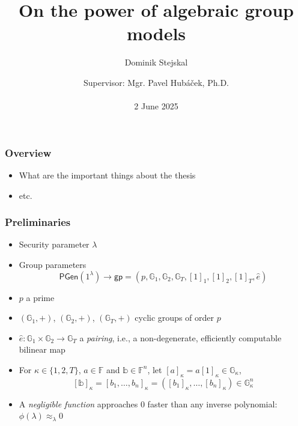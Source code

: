 \documentclass[9pt]{beamer}
\title{On the power of algebraic group models}
\author{Dominik Stejskal}
\date{Supervisor: Mgr. Pavel Hubáček, Ph.D.\\ \, \\2 June 2025}
\newcommand{\Z}{\mathbb{Z}}
\newcommand{\F}{\mathbb{F}}
\newcommand{\G}{\mathbb{G}}
\newcommand{\e}{\hat{e}}
\newcommand{\Pgen}{\mathsf{PGen}}
\newcommand{\negligible}{\approx_{\lambda} 0}
\newcommand{\gp}{\mathsf{gp}}  %
\begin{document}
\frame{\titlepage}




\begin{frame}
\frametitle{Overview}
\begin{itemize}
\item What are the important things about the thesis
\item etc.
\end{itemize}
\end{frame}


\begin{frame}
\frametitle{Preliminaries}
\begin{itemize}
    \item Security parameter $ \lambda $
    \item Group parameters 
    \[
    \Pgen(1^\lambda) \to \gp = (p, \G_1, \G_2, \G_T, [1]_1, [1]_2, [1]_T, \hat e)
    \]
    \item $ p $ a prime %
    \item $ (\G_1, +) $, $ (\G_2, +) $, $ (\G_T, +) $ cyclic groups of order $ p $
    \item $ \e \colon \G_1 \times \G_2 \to \G_T $ a \textit{pairing}, i.e., a non-degenerate, efficiently computable bilinear map 
    \item For $ \kappa \in \{ 1, 2, T \} $, $ a \in \F $ and $ \mathbb b \in \F^n $, let $ [a]_\kappa = a[1]_\kappa \in \G_\kappa $, 
    \[ 
    [\mathbb b]_\kappa = [b_1, \dots, b_n]_\kappa = ([b_1]_\kappa, \dots, [b_n]_\kappa) \in \G_\kappa^n
    \]
    \item A \textit{negligible function} approaches $ 0 $ faster than any inverse polynomial: $ \phi(\lambda) \negligible $
\end{itemize}
\end{frame}
\end{document}
